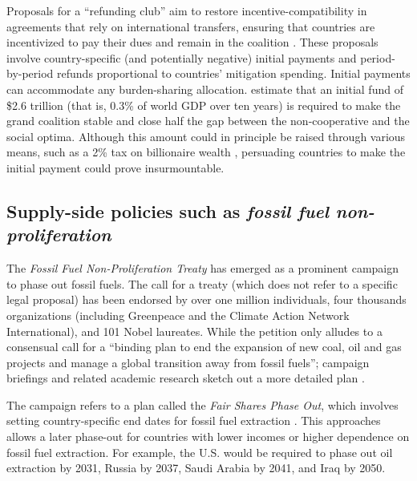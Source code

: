 \documentclass[12pt,english]{article}
\begin{document}
Proposals for a ``refunding club'' aim to restore incentive-compatibility in agreements that rely on international transfers, ensuring that countries are incentivized to pay their dues and remain in the coalition \citep{gersbach_long-term_2021,finus_mechanism_2024}. These proposals involve country-specific (and potentially negative) initial payments and period-by-period refunds proportional to countries' mitigation spending. %
Initial payments can accommodate any burden-sharing allocation. %
\cite{finus_modesty_2008} estimate that an initial fund of \$2.6 trillion (that is, 0.3\% of world GDP over ten years) is required to make the grand coalition stable and close half the gap between the non-cooperative and the social optima. Although this amount could in principle be raised through various means, such as a 2\% tax on billionaire wealth \citep{zucman_blueprint_2024}, persuading countries to make the initial payment could prove insurmountable. %

\subsection{Supply-side policies such as \textit{fossil fuel non-proliferation}}

The \textit{Fossil Fuel Non-Proliferation Treaty} has emerged as a prominent campaign to phase out fossil fuels. The call for a treaty (which does not refer to a specific legal proposal) has been endorsed by over one million individuals, four thousands organizations (including Greenpeace and the Climate Action Network International), and 101 Nobel laureates. While the petition only alludes to a consensual call for a ``binding plan to end the expansion of new coal, oil and gas projects and manage a global transition away from fossil fuels''; campaign briefings and related academic research sketch out a more detailed plan \citep{civil_society_equity_review_fair_2021,civil_society_equity_review_equitable_2023,calverley_phaseout_2022,fossil_fuel_non-proliferation_treaty_global_2023}.

The campaign refers to a plan called the \textit{Fair Shares Phase Out}, which involves setting country-specific end dates for fossil fuel extraction \citep{civil_society_equity_review_equitable_2023,calverley_phaseout_2022}. This approaches allows a later phase-out for countries with lower incomes or higher dependence on fossil fuel extraction. For example, the U.S. would be required to %
phase out oil extraction by 2031, Russia by 2037, Saudi Arabia by 2041, and Iraq by 2050.
\end{document}
